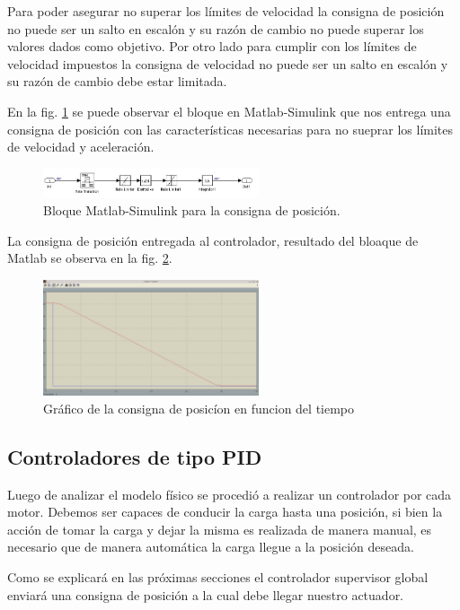 \documentclass[journal]{IEEEtran}
\begin{document}
Para poder asegurar no superar los límites de velocidad la consigna de posición no puede 
ser un salto en escalón y su razón de cambio no puede superar los valores dados como 
objetivo. 
Por otro lado para cumplir con los límites de velocidad impuestos la consigna de velocidad 
no puede ser un salto en escalón y su razón de cambio debe estar limitada.

En la fig. \ref{fig:bloque_consigna_pos} se puede observar el bloque en Matlab-Simulink
que nos entrega una consigna de posición con las características necesarias para no
sueprar los límites de velocidad y aceleración.

\begin{figure}[!t]
 \centering
  \includegraphics[width=2.5in]{bloque_consigna_posicion.jpeg}
  \caption{Bloque Matlab-Simulink para la consigna de posición.}
  \label{fig:bloque_consigna_pos} 
\end{figure}

La consigna de posición entregada al controlador, resultado del bloaque de Matlab 
se observa en la fig. \ref{fig:consigna_pos}.
\begin{figure}[!t]
 \centering
  \includegraphics[width=2.5in]{consigna_posicion.jpeg}
  \caption{Gráfico de la consigna de posicíon en funcion del tiempo}
  \label{fig:consigna_pos}
\end{figure}

\subsection{Controladores de tipo PID}
Luego de analizar el modelo físico se procedió a realizar un controlador por cada motor.
Debemos ser capaces de conducir la carga hasta una posición, si bien la acción de 
tomar la carga y dejar la misma es realizada de manera manual, es necesario que de manera
automática la carga llegue a la posición deseada. 

Como se explicará en las próximas secciones el controlador supervisor global enviará
una consigna de posición a la cual debe llegar nuestro actuador.
\end{document}
